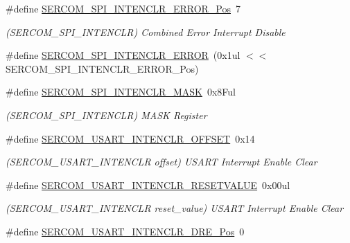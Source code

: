 \begin{DoxyCompactItemize}
\item 
\#define \mbox{\hyperlink{group___s_a_m_d21___s_e_r_c_o_m_ga67c425c1cd551259d9bc04b4f2510321}{S\+E\+R\+C\+O\+M\+\_\+\+S\+P\+I\+\_\+\+I\+N\+T\+E\+N\+C\+L\+R\+\_\+\+E\+R\+R\+O\+R\+\_\+\+Pos}}~7
\begin{DoxyCompactList}\small\item\em (S\+E\+R\+C\+O\+M\+\_\+\+S\+P\+I\+\_\+\+I\+N\+T\+E\+N\+C\+LR) Combined Error Interrupt Disable \end{DoxyCompactList}\item 
\#define \mbox{\hyperlink{group___s_a_m_d21___s_e_r_c_o_m_ga2bec344dac908bb08fcf8c988a1ee235}{S\+E\+R\+C\+O\+M\+\_\+\+S\+P\+I\+\_\+\+I\+N\+T\+E\+N\+C\+L\+R\+\_\+\+E\+R\+R\+OR}}~(0x1ul $<$$<$ S\+E\+R\+C\+O\+M\+\_\+\+S\+P\+I\+\_\+\+I\+N\+T\+E\+N\+C\+L\+R\+\_\+\+E\+R\+R\+O\+R\+\_\+\+Pos)
\item 
\#define \mbox{\hyperlink{group___s_a_m_d21___s_e_r_c_o_m_ga86471fcf42db9e017280002f28b2e8cc}{S\+E\+R\+C\+O\+M\+\_\+\+S\+P\+I\+\_\+\+I\+N\+T\+E\+N\+C\+L\+R\+\_\+\+M\+A\+SK}}~0x8\+Ful
\begin{DoxyCompactList}\small\item\em (S\+E\+R\+C\+O\+M\+\_\+\+S\+P\+I\+\_\+\+I\+N\+T\+E\+N\+C\+LR) M\+A\+SK Register \end{DoxyCompactList}\item 
\#define \mbox{\hyperlink{group___s_a_m_d21___s_e_r_c_o_m_ga7675caffd8e70928a8f150ecbc832c8d}{S\+E\+R\+C\+O\+M\+\_\+\+U\+S\+A\+R\+T\+\_\+\+I\+N\+T\+E\+N\+C\+L\+R\+\_\+\+O\+F\+F\+S\+ET}}~0x14
\begin{DoxyCompactList}\small\item\em (S\+E\+R\+C\+O\+M\+\_\+\+U\+S\+A\+R\+T\+\_\+\+I\+N\+T\+E\+N\+C\+LR offset) U\+S\+A\+RT Interrupt Enable Clear \end{DoxyCompactList}\item 
\#define \mbox{\hyperlink{group___s_a_m_d21___s_e_r_c_o_m_gaea5c5e11e08049934b9d34debd92e408}{S\+E\+R\+C\+O\+M\+\_\+\+U\+S\+A\+R\+T\+\_\+\+I\+N\+T\+E\+N\+C\+L\+R\+\_\+\+R\+E\+S\+E\+T\+V\+A\+L\+UE}}~0x00ul
\begin{DoxyCompactList}\small\item\em (S\+E\+R\+C\+O\+M\+\_\+\+U\+S\+A\+R\+T\+\_\+\+I\+N\+T\+E\+N\+C\+LR reset\+\_\+value) U\+S\+A\+RT Interrupt Enable Clear \end{DoxyCompactList}\item 
\#define \mbox{\hyperlink{group___s_a_m_d21___s_e_r_c_o_m_gabf252f5a7ea964a4f199739697aee772}{S\+E\+R\+C\+O\+M\+\_\+\+U\+S\+A\+R\+T\+\_\+\+I\+N\+T\+E\+N\+C\+L\+R\+\_\+\+D\+R\+E\+\_\+\+Pos}}~0
$$
\end{DoxyCompactItemize}

